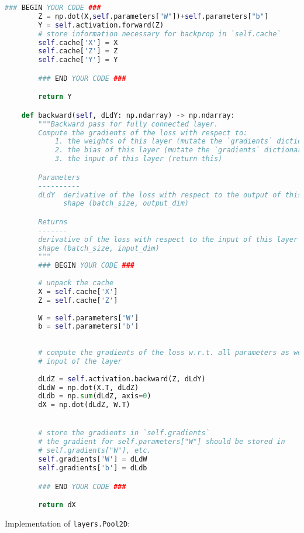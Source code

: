 \begin{lstlisting}[language=Python]
        ### BEGIN YOUR CODE ###        
        Z = np.dot(X,self.parameters["W"])+self.parameters["b"]
        Y = self.activation.forward(Z) 
        # store information necessary for backprop in `self.cache`
        self.cache['X'] = X
        self.cache['Z'] = Z
        self.cache['Y'] = Y

        ### END YOUR CODE ###

        return Y

    def backward(self, dLdY: np.ndarray) -> np.ndarray:
        """Backward pass for fully connected layer.
        Compute the gradients of the loss with respect to:
            1. the weights of this layer (mutate the `gradients` dictionary)
            2. the bias of this layer (mutate the `gradients` dictionary)
            3. the input of this layer (return this)

        Parameters
        ----------
        dLdY  derivative of the loss with respect to the output of this layer
              shape (batch_size, output_dim)

        Returns
        -------
        derivative of the loss with respect to the input of this layer
        shape (batch_size, input_dim)
        """
        ### BEGIN YOUR CODE ###
        
        # unpack the cache
        X = self.cache['X']
        Z = self.cache['Z']
             
        W = self.parameters['W']
        b = self.parameters['b']
        
        
        # compute the gradients of the loss w.r.t. all parameters as well as the
        # input of the layer
        
        dLdZ = self.activation.backward(Z, dLdY)
        dLdW = np.dot(X.T, dLdZ)
        dLdb = np.sum(dLdZ, axis=0)
        dX = np.dot(dLdZ, W.T)


        # store the gradients in `self.gradients`
        # the gradient for self.parameters["W"] should be stored in
        # self.gradients["W"], etc.
        self.gradients['W'] = dLdW
        self.gradients['b'] = dLdb

        ### END YOUR CODE ###

        return dX

\end{lstlisting}

Implementation of \texttt{layers.Pool2D}:

